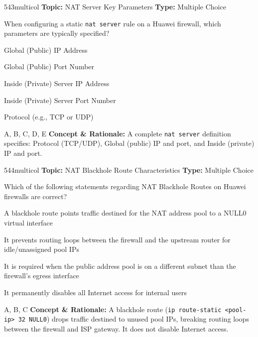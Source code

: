 \begin{qcard}{543}{multicol}
\textcolor{darkslate!75}{\small\textbf{Topic:} NAT Server Key Parameters \hfill \textbf{Type:} Multiple Choice}\vspace{0.4em}\par
When configuring a static \texttt{nat server} rule on a Huawei firewall, which parameters are typically specified?
\begin{qoptions}
\item Global (Public) IP Address
\item Global (Public) Port Number
\item Inside (Private) Server IP Address
\item Inside (Private) Server Port Number
\item Protocol (e.g., TCP or UDP)
\end{qoptions}
\end{qcard}
\nopagebreak
\begin{explainbox}{A, B, C, D, E}
\textbf{Concept \& Rationale:} A complete \texttt{nat server} definition specifies: Protocol (TCP/UDP), Global (public) IP and port, and Inside (private) IP and port.
\end{explainbox}

\begin{qcard}{544}{multicol}
\textcolor{darkslate!75}{\small\textbf{Topic:} NAT Blackhole Route Characteristics \hfill \textbf{Type:} Multiple Choice}\vspace{0.4em}\par
Which of the following statements regarding NAT Blackhole Routes on Huawei firewalls are correct?
\begin{qoptions}
\item A blackhole route points traffic destined for the NAT address pool to a NULL0 virtual interface
\item It prevents routing loops between the firewall and the upstream router for idle/unassigned pool IPs
\item It is required when the public address pool is on a different subnet than the firewall's egress interface
\item It permanently disables all Internet access for internal users
\end{qoptions}
\end{qcard}
\nopagebreak
\begin{explainbox}{A, B, C}
\textbf{Concept \& Rationale:} A blackhole route (\texttt{ip route-static \textless{}pool-ip\textgreater{} 32 NULL0}) drops traffic destined to unused pool IPs, breaking routing loops between the firewall and ISP gateway. It does not disable Internet access.
\end{explainbox}

